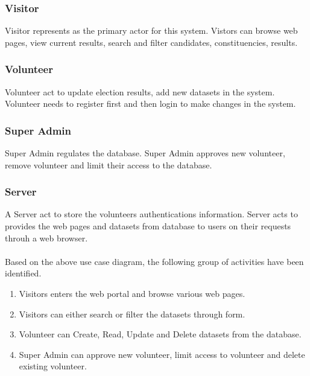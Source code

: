 \documentclass[12pt, a4paper, titlepage]{article}
\begin{document}
\subsubsection{Visitor}
Visitor represents as the primary actor for this system. Vistors can browse web pages, view current results, search and filter candidates, constituencies, results.

\subsubsection{Volunteer} 
Volunteer act to update election results, add new datasets in the system. Volunteer needs to register first and then login to make changes in the system.

\subsubsection{Super Admin}
Super Admin regulates the database. Super Admin approves new volunteer, remove volunteer and limit their access to the database.

\subsubsection{Server} 
A Server act to store the volunteers authentications information. Server acts to provides the web pages and datasets from database to users on their requests throuh a web browser. \\ \\
Based on the above use case diagram, the following group of activities have been identified.
\begin{enumerate}
\item Visitors enters the web portal and browse various web pages.
\item Visitors can either search or filter the datasets through form.
\item Volunteer can Create, Read, Update and Delete datasets from the database.
\item Super Admin can approve new volunteer, limit access to volunteer and delete existing volunteer.
\end{enumerate}

\newpage	
\end{document}

